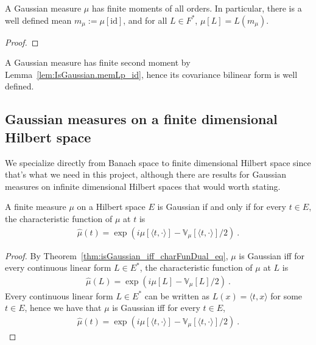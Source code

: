 \begin{lemma}\label{lem:IsGaussian.memLp_id}
  \leanok
A Gaussian measure $\mu$ has finite moments of all orders.
In particular, there is a well defined mean $m_\mu := \mu[\mathrm{id}]$, and for all $L \in F^*$, $\mu[L] = L(m_\mu)$.
\end{lemma}

\begin{proof}\leanok

\end{proof}

A Gaussian measure has finite second moment by Lemma~\ref{lem:IsGaussian.memLp_id}, hence its covariance bilinear form is well defined.


\subsection{Gaussian measures on a finite dimensional Hilbert space}

We specialize directly from Banach space to finite dimensional Hilbert space since that's what we need in this project, although there are results for Gaussian measures on infinite dimensional Hilbert spaces that would worth stating.

\begin{lemma}\label{lem:isGaussian_iff_charFun_eq}
  \leanok
A finite measure $\mu$ on a Hilbert space $E$ is Gaussian if and only if for every $t \in E$, the characteristic function of $\mu$ at $t$ is
\begin{align*}
  \hat{\mu}(t) =  \exp\left(i \mu[\langle t, \cdot \rangle] - \mathbb{V}_\mu[\langle t, \cdot \rangle] / 2\right) \: .
\end{align*}
\end{lemma}

\begin{proof}\leanok
By Theorem~\ref{thm:isGaussian_iff_charFunDual_eq}, $\mu$ is Gaussian iff for every continuous linear form $L \in E^*$, the characteristic function of $\mu$ at $L$ is
\begin{align*}
  \hat{\mu}(L) = \exp\left(i \mu[L] - \mathbb{V}_\mu[L] / 2\right) \: .
\end{align*}
Every continuous linear form $L \in E^*$ can be written as $L(x) = \langle t, x \rangle$ for some $t \in E$, hence we have that $\mu$ is Gaussian iff for every $t \in E$,
\begin{align*}
  \hat{\mu}(t) = \exp\left(i \mu[\langle t, \cdot \rangle] - \mathbb{V}_\mu[\langle t, \cdot \rangle] / 2\right) \: .
\end{align*}
\end{proof}

